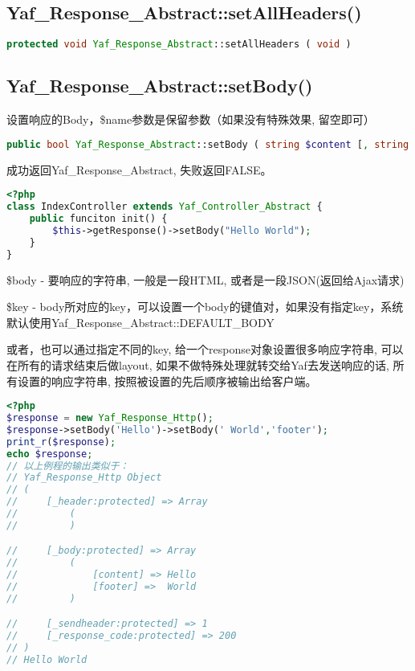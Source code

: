 \subsection{Yaf\_Response\_Abstract::setAllHeaders()}





\begin{lstlisting}[language=PHP]
protected void Yaf_Response_Abstract::setAllHeaders ( void )
\end{lstlisting}


\subsection{Yaf\_Response\_Abstract::setBody()}

设置响应的Body，\$name参数是保留参数（如果没有特殊效果, 留空即可）



\begin{lstlisting}[language=PHP]
public bool Yaf_Response_Abstract::setBody ( string $content [, string $key ] )
\end{lstlisting}

成功返回Yaf\_Response\_Abstract, 失败返回FALSE。

\begin{lstlisting}[language=PHP]
<?php
class IndexController extends Yaf_Controller_Abstract {
    public funciton init() {
        $this->getResponse()->setBody("Hello World");
    }
}
\end{lstlisting}

\begin{compactitem}
\item \$body - 要响应的字符串, 一般是一段HTML, 或者是一段JSON(返回给Ajax请求)
\item \$key - body所对应的key，可以设置一个body的键值对，如果没有指定key，系统默认使用Yaf\_Response\_Abstract::DEFAULT\_BODY
\end{compactitem}

或者，也可以通过指定不同的key, 给一个response对象设置很多响应字符串, 可以在所有的请求结束后做layout, 如果不做特殊处理就转交给Yaf去发送响应的话, 所有设置的响应字符串, 按照被设置的先后顺序被输出给客户端。


\begin{lstlisting}[language=PHP]
<?php
$response = new Yaf_Response_Http();
$response->setBody('Hello')->setBody(' World','footer');
print_r($response);
echo $response;
// 以上例程的输出类似于：
// Yaf_Response_Http Object
// (
//     [_header:protected] => Array
//         (
//         )

//     [_body:protected] => Array
//         (
//             [content] => Hello
//             [footer] =>  World
//         )

//     [_sendheader:protected] => 1
//     [_response_code:protected] => 200
// )
// Hello World
\end{lstlisting}

